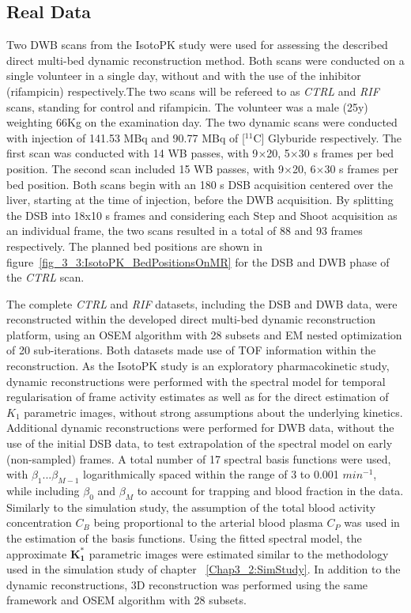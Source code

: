 \subsection{Real Data}
Two DWB scans from the IsotoPK study were used for assessing the described direct multi-bed dynamic reconstruction method. Both scans were conducted on a single volunteer in a single day, without and with the use of the inhibitor (rifampicin) respectively.The two scans will be refereed to as \textit{CTRL} and \textit{RIF} scans, standing for control and rifampicin. The volunteer was a male (25y) weighting 66Kg on the examination day. The two dynamic scans were conducted with injection of 141.53 MBq and 90.77 MBq of [$^{11}$C] Glyburide respectively. The first scan was conducted with 14 WB passes, with 9$\times$20, 5$\times$30 s frames per bed position. The second scan included 15 WB passes, with 9$\times$20, 6$\times$30 s frames per bed position. Both scans begin with an 180 s DSB acquisition centered over the liver, starting at the time of injection, before the DWB acquisition. By splitting the DSB into 18x10 s frames and considering each Step and Shoot acquisition as an individual frame, the two scans resulted in a total of 88 and 93 frames respectively. 
The planned bed positions are shown in figure~\ref{fig_3_3:IsotoPK_BedPositionsOnMR} for the DSB and DWB phase of the \textit{CTRL} scan. 

The complete \textit{CTRL} and \textit{RIF} datasets, including the DSB and DWB data, were reconstructed within the developed direct multi-bed dynamic reconstruction platform, using an OSEM algorithm with 28 subsets and EM nested optimization of 20 sub-iterations. Both datasets made use of TOF information within the reconstruction. 
As the IsotoPK study is an exploratory pharmacokinetic study, dynamic reconstructions were performed with the spectral model for temporal regularisation of frame activity estimates as well as for the direct estimation of $K_1$ parametric images, without strong assumptions about the underlying kinetics.
Additional dynamic reconstructions were performed for DWB data, without the use of the initial DSB data, to test extrapolation of the spectral model on early (non-sampled) frames. 
A total number of 17 spectral basis functions were used, with $\beta_1 ... \beta_{M-1}$ logarithmically spaced within the range of 3 to 0.001 $min^{-1}$, while including $\beta_0$ and $\beta_{M}$ to account for trapping and blood fraction in the data. Similarly to the simulation study, the assumption of the total blood activity concentration $C_{B}$ being proportional to the arterial blood plasma $C_{P}$ was used in the estimation of the basis functions.
Using the fitted spectral model, the approximate $\boldsymbol{K_1^*}$ parametric images were estimated similar to the methodology used in the simulation study of chapter ~\ref{Chap3_2:SimStudy}.
In addition to the dynamic reconstructions, 3D reconstruction was performed using the same framework and OSEM algorithm with 28 subsets.

